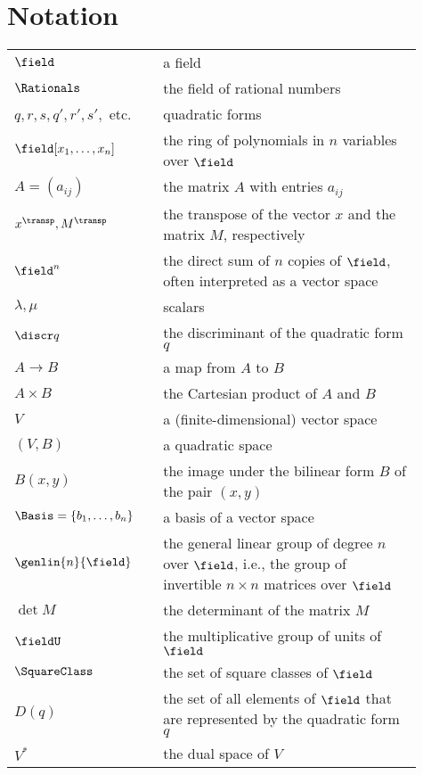 \chapter*{Notation}

\begin{longtable}{p{0.25\linewidth} p{0.01\linewidth} p{0.65\linewidth}}
    \(\field\) && a field\\
    \(\Rationals\) && the field of rational numbers\\
    \(q, r, s, q', r', s',\) etc. && quadratic forms\\
    \(\field[x_1, \dots, x_n]\) && the ring of polynomials in \(n\) variables
    over \(\field\)\\
    \(A = (a_{ij})\) && the matrix \(A\) with entries \(a_{ij}\)\\
    \(x^{\transp}, M^{\transp}\) && the transpose of the vector \(x\) and the
    matrix \(M\), respectively\\
    \(\field^n\) && the direct sum of \(n\) copies of \(\field\), often
    interpreted as a vector space\\
    \(\lambda, \mu\) && scalars\\
    \(\discr q\) && the discriminant of the quadratic form \(q\)\\
    \(A \to B\) && a map from \(A\) to \(B\)\\
    \(A \times B\) && the Cartesian product of \(A\) and \(B\)\\
    \(V\) && a (finite-dimensional) vector space\\
    \((V, B)\) && a quadratic space\\
    \(B(x, y)\) && the image under the bilinear form \(B\) of the pair \((x,
    y)\)\\
    \(\Basis = \{b_1, \dots, b_n\}\) && a basis of a vector space\\
    \(\genlin{n}{\field}\) && the general linear group of degree \(n\) over
    \(\field\), i.e., the group of invertible \(n \times n\) matrices over
    \(\field\)\\
    \(\det M\) && the determinant of the matrix \(M\)\\
    \(\fieldU\) && the multiplicative group of units of \(\field\)\\
    \(\SquareClass\) && the set of square classes of \(\field\)\\
    \(D(q)\) && the set of all elements of \(\field\) that are represented by
    the quadratic form \(q\)\\
    \(V^*\) && the dual space of \(V\)\\

\end{longtable}
